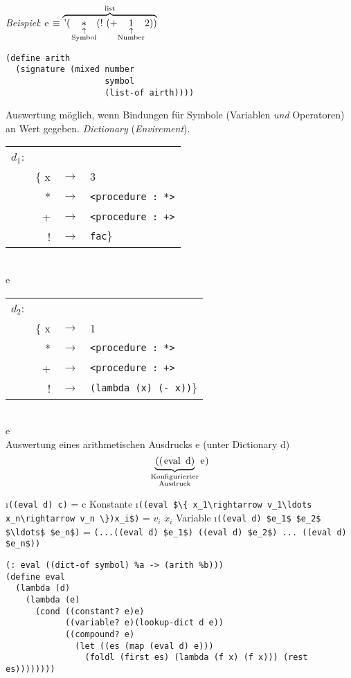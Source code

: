 \emph{Beispiel}: e $\equiv \overbrace{\text{\lstinline[mathescape]|'($\underset{\substack{\uparrow\\\text{Symbol}}}{*}
$(! (+ $\underset{\substack{\uparrow\\\text{Number}}}{1}$ 2))|}}^{\text{list}}$\\
\begin{lstlisting}
(define arith
  (signature (mixed number
                    symbol
                    (list-of airth))))
\end{lstlisting}
Auswertung möglich, wenn Bindungen für Symbole (Variablen \emph{und} Operatoren) an Wert gegeben. \emph{Dictionary} (\emph{Envirement}).\\
\begin{tabular}{lrcl}
$d_1$:\\
&$\lbrace$ x&$\rightarrow$& 3\\
&*&$\rightarrow$& \lstinline|<procedure : *>|\\
&+&$\rightarrow$& \lstinline|<procedure : +>|\\
&!&$\rightarrow$& \lstinline|fac|$\rbrace$\\
\end{tabular}\\
e\\
\begin{tabular}{lrcl}
$d_2$:\\
&$\lbrace$ x&$\rightarrow$& 1\\
&*&$\rightarrow$& \lstinline|<procedure : *>|\\
&+&$\rightarrow$& \lstinline|<procedure : +>|\\
&!&$\rightarrow$& \lstinline|(lambda (x) (- x))|$\rbrace$\\
\end{tabular}\\
e\\
Auswertung eines arithmetischen Ausdrucks e (unter Dictionary d)
\[ \underbrace{\text{\lstinline|((eval d) |}}_{\substack{\text{Konfigurierter}\\\text{Ausdruck}}}\text{\lstinline|e)|} \]
\begin{enumerate}[(E1)]
\i \lstinline|((eval d) c)| = c \hfill Konstante
\i \lstinline[mathescape]|((eval $\{ x_1\rightarrow v_1\ldots x_n\rightarrow v_n \})x_i$)| = $v_i$ \hfill $x_i$ Variable
\i \lstinline[mathescape]|((eval d) $e_1$ $e_2$ $\ldots$ $e_n$)| = \lstinline[mathescape]|(...((eval d) $e_1$) ((eval d) $e_2$) ... ((eval d) $e_n$))|
\end{enumerate}
\begin{lstlisting}
(: eval ((dict-of symbol) %a -> (arith %b)))
(define eval
  (lambda (d)
    (lambda (e)
      (cond ((constant? e)e)
            ((variable? e)(lookup-dict d e))
            ((compound? e)
              (let ((es (map (eval d) e)))
                (foldl (first es) (lambda (f x) (f x))) (rest es))))))))
\end{lstlisting}